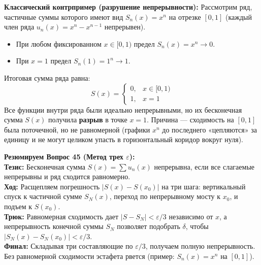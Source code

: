 \textbf{Классический контрпример (разрушение непрерывности):}
Рассмотрим ряд, частичные суммы которого имеют вид $S_n(x) = x^n$ на отрезке $[0,1]$ (каждый член ряда $u_n(x) = x^n - x^{n-1}$ непрерывен). 
\begin{itemize}
    \item При любом фиксированном $x \in [0, 1)$ предел $S_n(x) = x^n \to 0$.
    \item При $x = 1$ предел $S_n(1) = 1^n \to 1$.
\end{itemize}
Итоговая сумма ряда равна:
$$
S(x) = \begin{cases} 0, & x \in [0, 1) \\ 1, & x = 1 \end{cases}
$$
Все функции внутри ряда были идеально непрерывными, но их бесконечная сумма $S(x)$ получила \textbf{разрыв} в точке $x=1$. Причина — сходимость на $[0,1]$ была поточечной, но не равномерной (графики $x^n$ до последнего «цепляются» за единицу и не могут целиком упасть в горизонтальный коридор вокруг нуля).

\begin{tcolorbox}[colback=gray!5, colframe=black, boxrule=0.5pt, arc=0pt]
\textbf{Резюмируем Вопрос 45 (Метод трех $\varepsilon$):} \\
\textbf{Тезис:} Бесконечная сумма $S(x) = \sum u_n(x)$ непрерывна, если все слагаемые непрерывны и ряд сходится равномерно. \\
\textbf{Ход:} Расщепляем погрешность $|S(x) - S(x_0)|$ на три шага: вертикальный спуск к частичной сумме $S_N(x)$, переход по непрерывному мосту к $x_0$, и подъем к $S(x_0)$. \\
\textbf{Трюк:} Равномерная сходимость дает $|S - S_N| < \varepsilon/3$ независимо от $x$, а непрерывность конечной суммы $S_N$ позволяет подобрать $\delta$, чтобы $|S_N(x) - S_N(x_0)| < \varepsilon/3$. \\
\textbf{Финал:} Складывая три составляющие по $\varepsilon/3$, получаем полную непрерывность. Без равномерной сходимости эстафета рвется (пример: $S_n(x) = x^n$ на $[0,1]$).
\end{tcolorbox}